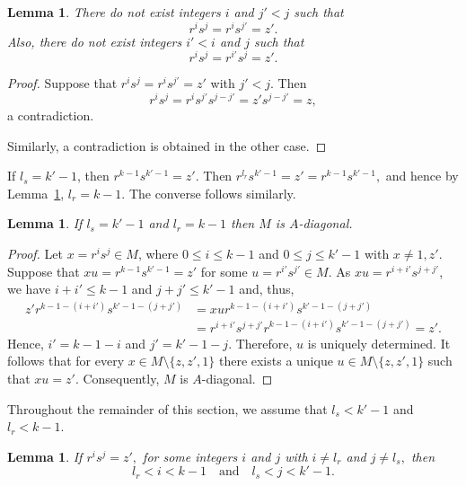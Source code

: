 \documentclass[11pt,reqno]{amsart}
\theoremstyle{plain}
\newtheorem{lem}[thm]{Lemma}
\theoremstyle{remark}
\theoremstyle{definition}
\begin{document}
\begin{lem}\label{ii'j}
There do not exist integers $i$ and $j' < j$ such that
\[
r^i s^j = r^i s^{j'} = z'.
\]
Also, there do not exist integers $i' < i$ and $j$ such that
\[
r^i s^j = r^{i'} s^{j} = z'.
\]
\end{lem}

\begin{proof}
Suppose that
\(
r^i s^j = r^i s^{j'} = z'
\)
with $j' < j$. Then
\[
r^i s^j = r^i s^{j'} s^{j-j'} = z' s^{j-j'} = z,
\]
a contradiction.

Similarly, a contradiction is obtained in the other case.
\end{proof}


If $l_s = k'-1$, then
\(
r^{k-1}s^{k'-1} = z'.
\)
Then
\(
r^{l_r}s^{k'-1} = z' = r^{k-1}s^{k'-1},
\)
and hence by Lemma~\ref{ii'j}, $l_r = k-1$. The converse follows similarly.

\begin{lem}\label{k'-1k-1}
If $l_s = k'-1$ and $l_r = k-1$ then $M$ is $A$-diagonal.
\end{lem}

\begin{proof}
Let $x = r^i s^j \in M$, where $0 \le i \le k-1$ and $0 \le j \le k'-1$ with $x\neq 1,z'$. Suppose that
\(
x u = r^{k-1}s^{k'-1} = z'
\)
for some $u = r^{i'} s^{j'} \in M$.
As $xu= r^{i+i'} s^{j+j'}$, we have $i+i'\leq k-1$ and $j+j'\leq k'-1$ and, thus,
\begin{align*}
z'r^{k-1-(i+i')}s^{k'-1-(j+j')}&=xur^{k-1-(i+i')}s^{k'-1-(j+j')}\\&=r^{i+i'} s^{j+j'}r^{k-1-(i+i')}s^{k'-1-(j+j')}=z'.
\end{align*}
Hence, $i'=k-1-i$ and $j'=k'-1-j$. 
Therefore, $u$ is uniquely determined. It follows that for every $x \in M \setminus \{z,z',1\}$ there exists a unique $u \in M \setminus \{z,z',1\}$ such that $xu = z'$. Consequently, $M$ is $A$-diagonal.
\end{proof}

Throughout the remainder of this section, we assume that
\(l_s < k'-1\)
and
\(l_r < k-1\).

\begin{lem}\label{ijl1l2}
If
\(
r^{i}s^{j} = z',
\)
for some integers $i$ and $j$ with
\(i \neq l_r\) and \(j \neq l_s,\)
then
\[
l_r < i < k-1
\quad \text{and} \quad
l_s < j < k'-1.
\]
\end{lem}
\end{document}
